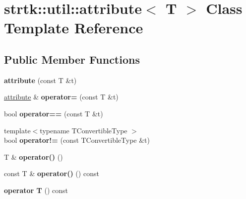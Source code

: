 \hypertarget{classstrtk_1_1util_1_1attribute}{\section{strtk\-:\-:util\-:\-:attribute$<$ T $>$ Class Template Reference}
\label{classstrtk_1_1util_1_1attribute}
}
\subsection*{Public Member Functions}
\begin{DoxyCompactItemize}
\item 
\hypertarget{classstrtk_1_1util_1_1attribute_ad9a0f1e40d3e0c72947c354a2b5bc34c}{{\bfseries attribute} (const T \&t)}\label{classstrtk_1_1util_1_1attribute_ad9a0f1e40d3e0c72947c354a2b5bc34c}

\item 
\hypertarget{classstrtk_1_1util_1_1attribute_a8bed890f3eb35bbb7eb57bc2f604428d}{\hyperlink{classstrtk_1_1util_1_1attribute}{attribute} \& {\bfseries operator=} (const T \&t)}\label{classstrtk_1_1util_1_1attribute_a8bed890f3eb35bbb7eb57bc2f604428d}

\item 
\hypertarget{classstrtk_1_1util_1_1attribute_a2bdae6df7aa24b8b6ad7e7bc066094df}{bool {\bfseries operator==} (const T \&t)}\label{classstrtk_1_1util_1_1attribute_a2bdae6df7aa24b8b6ad7e7bc066094df}

\item 
\hypertarget{classstrtk_1_1util_1_1attribute_a199064f406bd0e717a87859f0c25fe4f}{{\footnotesize template$<$typename T\-Convertible\-Type $>$ }\\bool {\bfseries operator!=} (const T\-Convertible\-Type \&t)}\label{classstrtk_1_1util_1_1attribute_a199064f406bd0e717a87859f0c25fe4f}

\item 
\hypertarget{classstrtk_1_1util_1_1attribute_aaea53cb8b0550f60651b0196dc0b622d}{T \& {\bfseries operator()} ()}\label{classstrtk_1_1util_1_1attribute_aaea53cb8b0550f60651b0196dc0b622d}

\item 
\hypertarget{classstrtk_1_1util_1_1attribute_ad903294194fd1c89dbf3bd6edb1939cd}{const T \& {\bfseries operator()} () const }\label{classstrtk_1_1util_1_1attribute_ad903294194fd1c89dbf3bd6edb1939cd}

\item 
\hypertarget{classstrtk_1_1util_1_1attribute_aed574d62f65022c767e13b501741f9eb}{{\bfseries operator T} () const }\label{classstrtk_1_1util_1_1attribute_aed574d62f65022c767e13b501741f9eb}


\end{DoxyCompactItemize}
